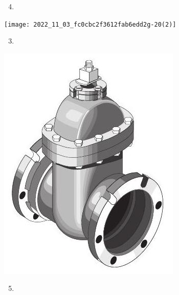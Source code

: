 \documentclass[10pt]{article}
\begin{document}
\begin{enumerate}
  \setcounter{enumi}{3}
  \item 
\end{enumerate}
\texttt{[image: 2022\_11\_03\_fc0cbc2f3612fab6edd2g-20(2)]}

\begin{enumerate}
  \setcounter{enumi}{2}
  \item 
\end{enumerate}
\includegraphics[max width=\textwidth]{2022_11_03_fc0cbc2f3612fab6edd2g-20(3)}

\begin{enumerate}
  \setcounter{enumi}{4}
  \item 
\end{enumerate}
\end{document}
